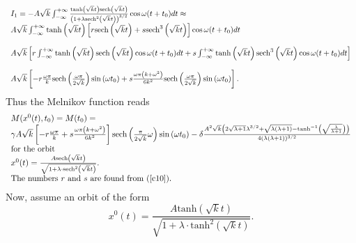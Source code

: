 \documentclass{ws-ijbc}
\begin{document}
\begin{equation}
\begin{tabular}{l}
$I_{1}=-A\sqrt{k}\int_{-\infty }^{+\infty }\frac{\tanh \left( \sqrt{k}%
t\right) \text{sech}\left( \sqrt{k}t\right) }{\left( 1+\lambda \text{sech}%
^{2}\left( \sqrt{k}t\right) \right) ^{3/2}}\cos \omega (t+t_{0})dt\approx $
\\ 
$A\sqrt{k}\int_{-\infty }^{+\infty }\tanh \left( \sqrt{k}t\right) \left[ r%
\text{sech}\left( \sqrt{k}t\right) +s\text{sech}^{3}\left( \sqrt{k}t\right) %
\right] \cos \omega (t+t_{0})dt$ \\ 
\\ 
$A\sqrt{k}\left[ r\int_{-\infty }^{+\infty }\tanh \left( \sqrt{k}t\right) 
\text{sech}\left( \sqrt{k}t\right) \cos \omega (t+t_{0})dt+s\int_{-\infty
}^{+\infty }\tanh \left( \sqrt{k}t\right) \text{sech}^{3}\left( \sqrt{k}%
t\right) \cos \omega (t+t_{0})dt\right] $ \\ 
\\ 
$A\sqrt{k}\left[ -r\frac{\omega \pi }{k}\text{sech}\left( \frac{\omega \pi }{%
2\sqrt{k}}\right) \sin \left( \omega t_{0}\right) +s\frac{\omega \pi \left(
k+\omega ^{2}\right) }{6k^{2}}\text{sech}\left( \frac{\omega \pi }{2\sqrt{k}}%
\right) \sin \left( \omega t_{0}\right) \right] .$%
\end{tabular}
\label{c11}
\end{equation}%
Thus the Melnikov function reads 
\begin{equation}
\begin{tabular}{l}
$M(x^{0}(t),t_{0})=M(t_{0})=$ \\ 
$\gamma A\sqrt{k}\left[ -r\frac{\omega \pi }{k}+s\frac{\omega \pi \left(
k+\omega ^{2}\right) }{6k^{2}}\right] \text{sech}\left( \frac{\pi }{2\sqrt{k}%
}\omega \right) \sin \left( \omega t_{0}\right) -\delta \frac{A^{2}\sqrt{k}%
\left( 2\sqrt{\lambda +1}\lambda ^{3/2}+\sqrt{\lambda (\lambda +1)}-\tanh
^{-1}\left( \sqrt{\frac{\lambda }{\lambda +1}}\right) \right) }{4(\lambda
(\lambda +1))^{3/2}}$ \\ 
for the orbit \\ 
$x^{0}(t)=\frac{A\text{sech}\left( \sqrt{k}t\right) }{\sqrt{1+\lambda \cdot 
\text{sech}^{2}\left( \sqrt{k}t\right) }}.$ \\ 
The numbers $r$ and $s$ are found from (\ref{c10}).%
\end{tabular}
\label{c12}
\end{equation}%
Now, assume an orbit of the form 
\begin{equation}
x^{0}(t)=\frac{A\text{tanh}\left( \sqrt{k}t\right) }{\sqrt{1+\lambda \cdot 
\text{tanh}^{2}\left( \sqrt{k}t\right) }}.  \label{c13}
\end{equation}%
\end{document}
